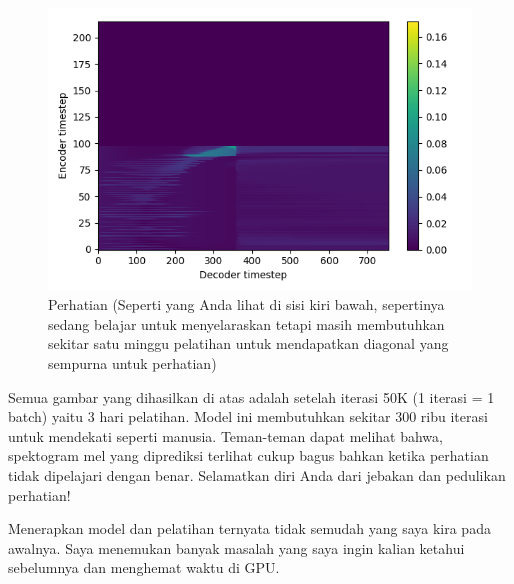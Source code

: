 \begin{figure}[H]
        \centerline{\includegraphics[scale=.5]{figures/ref3}}
        \caption{Perhatian (Seperti yang Anda lihat di sisi kiri bawah, sepertinya sedang belajar untuk menyelaraskan tetapi masih membutuhkan sekitar satu minggu pelatihan untuk mendapatkan diagonal yang sempurna untuk perhatian)}
		\label{ref3}
\end{figure}
Semua gambar yang dihasilkan di atas adalah setelah iterasi 50K (1 iterasi = 1 batch) yaitu 3 hari pelatihan. Model ini membutuhkan sekitar 300 ribu iterasi untuk mendekati seperti manusia. Teman-teman dapat melihat bahwa, spektogram mel yang diprediksi terlihat cukup bagus bahkan ketika perhatian tidak dipelajari dengan benar. Selamatkan diri Anda dari jebakan dan pedulikan perhatian!

Menerapkan model dan pelatihan ternyata tidak semudah yang saya kira pada awalnya. Saya menemukan banyak masalah yang saya ingin kalian ketahui sebelumnya dan menghemat waktu di GPU.

